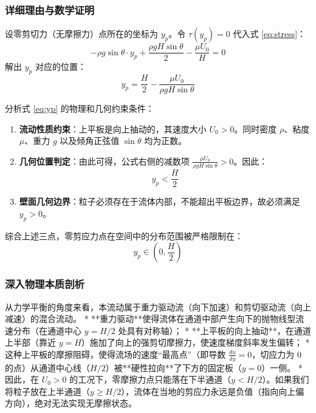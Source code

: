 \documentclass[11pt,a4paper]{article}
\begin{document}
\subsubsection*{详细理由与数学证明}
设零剪切力（无摩擦力）点所在的坐标为 $y_p$。令 $\tau(y_p) = 0$ 代入式 \eqref{eq:stress}：
\begin{equation}
    -\rho g \sin\theta \cdot y_p + \frac{\rho g H \sin\theta}{2} - \frac{\mu U_0}{H} = 0
\end{equation}
解出 $y_p$ 对应的位置：
\begin{equation}
    y_p = \frac{H}{2} - \frac{\mu U_0}{\rho g H \sin\theta}
    \label{eq:yp}
\end{equation}

分析式 \eqref{eq:yp} 的物理和几何约束条件：
\begin{enumerate}
    \item \textbf{流动性质约束}：上平板是向上抽动的，其速度大小 $U_0 > 0$。同时密度 $\rho$、粘度 $\mu$、重力 $g$ 以及倾角正弦值 $\sin\theta$ 均为正数。
    \item \textbf{几何位置判定}：由此可得，公式右侧的减数项 $\frac{\mu U_0}{\rho g H \sin\theta} > 0$。因此：
    \begin{equation}
        y_p < \frac{H}{2}
    \end{equation}
    \item \textbf{壁面几何边界}：粒子必须存在于流体内部，不能超出平板边界，故必须满足 $y_p > 0$。
\end{enumerate}
综合上述三点，零剪应力点在空间中的分布范围被严格限制在：
\begin{equation}
    y_p \in \left( 0, \frac{H}{2} \right)
\end{equation}

\subsubsection*{深入物理本质剖析}
从力学平衡的角度来看，本流动属于重力驱动流（向下加速）和剪切驱动流（向上减速）的混合流动。
* **重力驱动**使得流体在通道中部产生向下的抛物线型流速分布（在通道中心 $y=H/2$ 处具有对称轴）；
* **上平板的向上抽动**，在通道上半部（靠近 $y=H$）施加了向上的强剪切摩擦力，使速度梯度斜率发生偏转；
* 这种上平板的摩擦阻碍，使得流场的速度“最高点”（即导数 $\frac{du}{dy} = 0$，切应力为 $0$ 的点）从通道中心线（$H/2$）被**硬性拉向**了下方的固定板（$y=0$）一侧。
* 因此，在 $U_0 > 0$ 的工况下，零摩擦力点只能落在下半通道（$y < H/2$）。如果我们将粒子放在上半通道（$y \ge H/2$），流体在当地的剪应力永远是负值（指向向上偏方向），绝对无法实现无摩擦状态。
\end{document}
